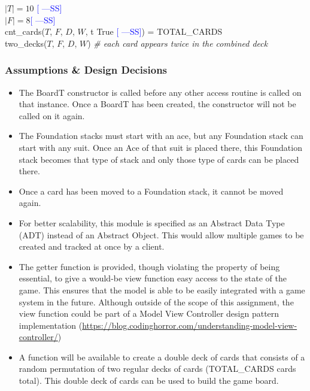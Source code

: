 \documentclass[12pt]{article}
\newcommand{\authornote}[3]{\textcolor{#1}{[#3 ---#2]}}
\newcommand{\authornote}[3]{}
\newcommand{\wss}[1]{\authornote{blue}{SS}{#1}}
\begin{document}
$|T| = 10$ \wss{} \\
$|F| = 8$\wss{\text{What goes here?}}\\
cnt\_cards($T$, $F$, $D$, $W$, \lambda t \rightarrow True \wss{}) = TOTAL\_CARDS\\
two\_decks($T$, $F$, $D$, $W$) \textit{\# each card appears twice in the combined deck}

\subsubsection* {Assumptions \& Design Decisions}

\begin{itemize}

\item The BoardT constructor is called before any other access
  routine is called on that instance. Once a BoardT has been created, the
  constructor will not be called on it again.

\item The Foundation stacks must start with an ace, but any Foundation stack can
  start with any suit. Once an Ace of that suit is placed there, this Foundation
  stack becomes that type of stack and only those type of cards can be placed
  there.

\item Once a card has been moved to a Foundation stack, it cannot be moved again.

\item For better scalability, this module is specified as an Abstract Data Type
  (ADT) instead of an Abstract Object. This would allow multiple games to be
  created and tracked at once by a client.

\item The getter function is provided, though violating the property of being
  essential, to give a would-be view function easy access to the state of the
  game. This ensures that the model is able to be easily integrated with a game
  system in the future.  Although outside of the scope of this assignment, the
  view function could be part of a Model View Controller design pattern implementation
  (\url{https://blog.codinghorror.com/understanding-model-view-controller/})

\item A function will be available to create a double deck of cards that
  consists of a random permutation of two regular decks of cards (TOTAL\_CARDS
  cards total).  This double deck of cards can be used to build the game board.

\end{itemize}
\end{document}
